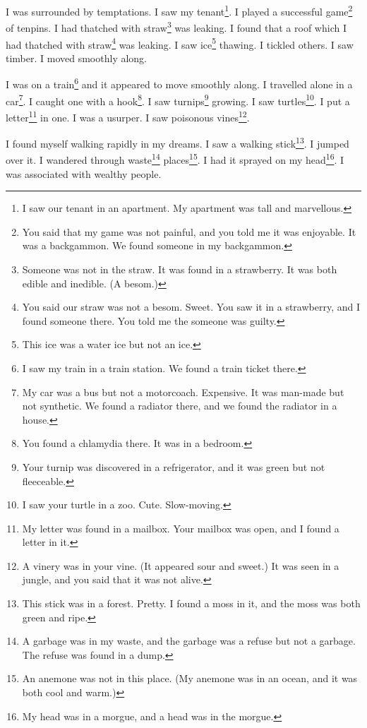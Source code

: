 \documentclass[12pt]{book}
\begin{document}
 I was surrounded by temptations. I saw my tenant\footnote{I saw our tenant in an apartment. My apartment was tall and marvellous.}. I played a successful game\footnote{You said that my game was not painful, and you told me it was enjoyable. It was a backgammon. We found someone in my backgammon.} of tenpins. I had thatched with straw\footnote{Someone was not in the straw. It was found in a strawberry. It was both edible and inedible. (A besom.)} was leaking. I found that a roof which I had thatched with straw\footnote{You said our straw was not a besom. Sweet. You saw it in a strawberry, and I found someone there. You told me the someone was guilty.} was leaking. I saw ice\footnote{This ice was a water ice but not an ice.} thawing. I tickled others. I saw timber. I moved smoothly along. 

 I was on a train\footnote{I saw my train in a train station. We found a train ticket there.} and it appeared to move smoothly along. I travelled alone in a car\footnote{My car was a bus but not a motorcoach. Expensive. It was man-made but not synthetic. We found a radiator there, and we found the radiator in a house.}. I caught one with a hook\footnote{You found a chlamydia there. It was in a bedroom.}. I saw turnips\footnote{Your turnip was discovered in a refrigerator, and it was green but not fleeceable.} growing. I saw turtles\footnote{I saw your turtle in a zoo. Cute. Slow-moving.}. I put a letter\footnote{My letter was found in a mailbox. Your mailbox was open, and I found a letter in it.} in one. I was a usurper. I saw poisonous vines\footnote{A vinery was in your vine. (It appeared sour and sweet.) It was seen in a jungle, and you said that it was not alive.}. 

 I found myself walking rapidly in my dreams. I saw a walking stick\footnote{This stick was in a forest. Pretty. I found a moss in it, and the moss was both green and ripe.}. I jumped over it. I wandered through waste\footnote{A garbage was in my waste, and the garbage was a refuse but not a garbage. The refuse was found in a dump.} places\footnote{An anemone was not in this place. (My anemone was in an ocean, and it was both cool and warm.)}. I had it sprayed on my head\footnote{My head was in a morgue, and a head was in the morgue.}. I was associated with wealthy people. 
\end{document}

